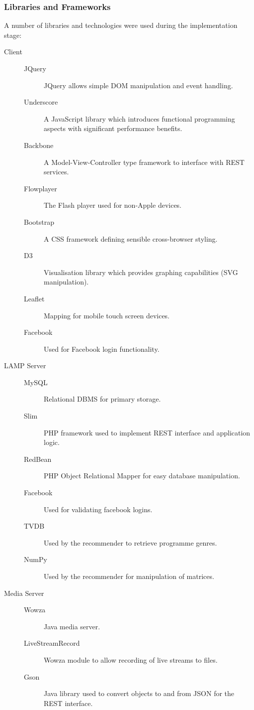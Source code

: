\subsubsection{Libraries and Frameworks}

A number of libraries and technologies were used during the implementation stage:

\begin{description}
	\item[Client] \hfill
		\begin{description}
			\item[JQuery] JQuery allows simple DOM manipulation and event handling.
			\item[Underscore] A JavaScript library which introduces functional programming aspects with significant performance benefits.
			\item[Backbone] A Model-View-Controller type framework to interface with REST services.
			\item[Flowplayer] The Flash player used for non-Apple devices.
			\item[Bootstrap] A CSS framework defining sensible cross-browser styling.
			\item[D3] Visualisation library which provides graphing capabilities (SVG manipulation).
			\item[Leaflet] Mapping for mobile touch screen devices.
			\item[Facebook] Used for Facebook login functionality.
		\end{description}
	\item[LAMP Server] \hfill
		\begin{description}
			\item[MySQL] Relational DBMS for primary storage.
			\item[Slim] PHP framework used to implement REST interface and application logic.
			\item[RedBean] PHP Object Relational Mapper for easy database manipulation.
			\item[Facebook] Used for validating facebook logins.
			\item[TVDB] Used by the recommender to retrieve programme genres.
			\item[NumPy] Used by the recommender for manipulation of matrices.
		\end{description}
	\item[Media Server] \hfill
		\begin{description}
			\item[Wowza] Java media server.
			\item[LiveStreamRecord] Wowza module to allow recording of live streams to files.
			\item[Gson] Java library used to convert objects to and from JSON for the REST interface.
		\end{description}
\end{description}


